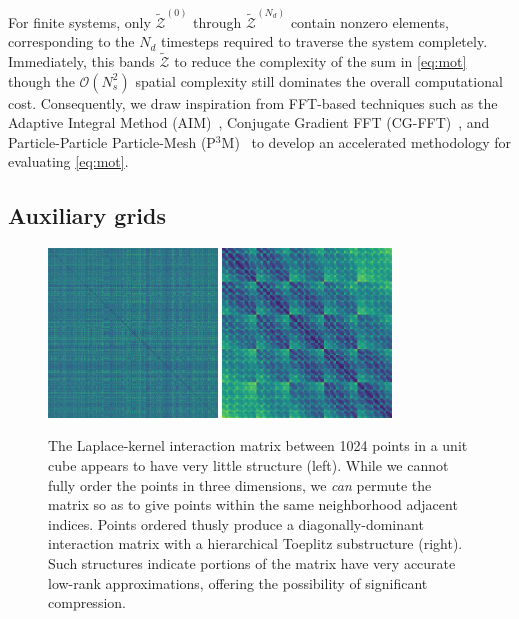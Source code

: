 For finite systems, only $\tilde{\mathcal{Z}}^{(0)}$ through $\tilde{\mathcal{Z}}^{(N_d)}$ contain nonzero elements, corresponding to the $N_d$ timesteps required to traverse the system completely.
Immediately, this bands $\tilde{\mathcal{Z}}$ to reduce the complexity of the sum in \cref{eq:mot} though the $\mathcal{O}(N_s^2)$ spatial complexity still dominates the overall computational cost.
Consequently, we draw inspiration from FFT-based techniques such as the Adaptive Integral Method (AIM)~\cite{Bleszynski1996,Yilmaz2004}, Conjugate Gradient FFT (CG-FFT)~\cite{CG-FFT}, and Particle-Particle Particle-Mesh (P$^3$M)~\cite{p cubed m} to develop an accelerated methodology for evaluating \cref{eq:mot}.

\subsection{Auxiliary grids}

\begin{figure}
  \centering
  \includegraphics[width=0.4\textwidth]{figures/dist_mat_unsorted}
  \hspace{1cm}
  \includegraphics[width=0.4\textwidth]{figures/dist_mat_sorted}
  \caption{\label{fig:matrix structure} The Laplace-kernel interaction matrix between 1024 points in a unit cube appears to have very little structure (left).
    While we cannot fully order the points in three dimensions, we \emph{can} permute the matrix so as to give points within the same neighborhood adjacent indices.
    Points ordered thusly produce a diagonally-dominant interaction matrix with a hierarchical Toeplitz substructure (right).
    Such structures indicate portions of the matrix have very accurate low-rank approximations, offering the possibility of significant compression.
  }
\end{figure}

